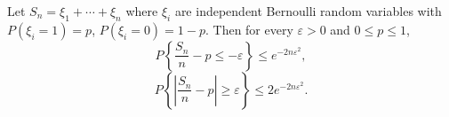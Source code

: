 Let $S_n = \xi_1 + \cdots + \xi_n$ where $\xi_i$ are independent Bernoulli random variables with $P(\xi_i = 1) = p$, $P(\xi_i = 0) = 1 - p$. Then for every $\varepsilon > 0$ and $0 \leq p \leq 1$,
$$
P\left\{\frac{S_n}{n} - p \leq -\varepsilon\right\} \leq e^{-2n\varepsilon^2}, \tag{41}
$$
$$
P\left\{\left|\frac{S_n}{n} - p\right| \geq \varepsilon\right\} \leq 2e^{-2n\varepsilon^2}. \tag{42}
$$
